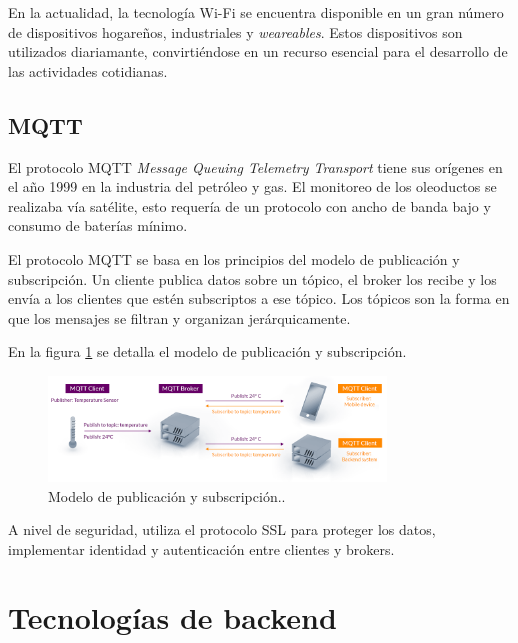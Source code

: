 En la actualidad, la tecnología Wi-Fi se encuentra disponible en un gran número de dispositivos hogareños, industriales y \textit{weareables}. Estos dispositivos son utilizados diariamante, convirtiéndose en un recurso esencial para el desarrollo de las actividades cotidianas.

\subsection{MQTT}
El protocolo MQTT \textit{Message Queuing Telemetry Transport} tiene sus orígenes en el año 1999 en la industria del petróleo y gas. El monitoreo de los oleoductos se realizaba vía satélite, esto requería de un protocolo con ancho de banda bajo y consumo de baterías mínimo.

El protocolo MQTT se basa en los principios del modelo de publicación y subscripción. Un cliente publica datos sobre un tópico, el broker los recibe y los envía a los clientes que estén subscriptos a ese tópico. Los tópicos son la forma en que los mensajes se filtran y organizan jerárquicamente.

En la figura \ref{fig:MQTT} se detalla el modelo de publicación y subscripción.


\begin{figure}[htbp]
	\centering
	\includegraphics[width=0.8\textwidth]{./Figures/MQTT.png}
	\caption{Modelo de publicación y subscripción.\protect\footnotemark.}
	\label{fig:MQTT}
\end{figure} 

A nivel de seguridad, utiliza el protocolo SSL para proteger los datos, implementar identidad y autenticación entre clientes y brokers.


\newpage
\section{Tecnologías de backend}

